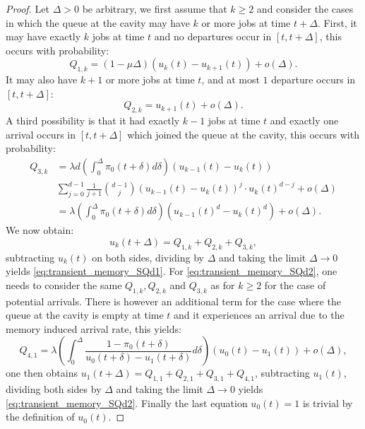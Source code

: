 \documentclass[12pt]{report}
\begin{document}
\begin{proof}
Let $\Delta > 0$ be arbitrary, we first assume that $k\geq 2$ and consider the cases in which the queue at the cavity may have $k$ or more jobs at time $t+\Delta$. First, it may have exactly $k$ jobs at time $t$ and no departures occur in $[t,t+\Delta]$, this occurs with probability:
\begin{equation}
Q_{1,k}=(1-\mu \Delta) (u_k(t)-u_{k+1}(t)) + o(\Delta). \label{eq:transient_uk_proof_1.1}
\end{equation}
It may also have $k+1$ or more jobs at time $t$, and at most $1$ departure occurs in $[t,t+\Delta]$:
\begin{equation}
Q_{2,k}=u_{k+1}(t) + o(\Delta). \label{eq:transient_uk_proof_1.2}
\end{equation}
A third possibility is that it had exactly $k-1$ jobs at time $t$ and exactly one arrival occurs in $[t,t+\Delta]$ which joined the queue at the cavity, this occurs with probability:
\begin{align}
Q_{3,k}&=\lambda d  \left(\int_0^\Delta \pi_0(t+\delta) d\delta \right)  (u_{k-1}(t)-u_k(t)) \\
&\sum_{j=0}^{d-1} \frac{1}{j+1	} \binom{d-1}{j} (u_{k-1}(t)-u_k(t))^j \cdot u_k(t)^{d-j} +o(\Delta)\nonumber\\
&= \lambda \left(\int_0^\Delta \pi_0(t+\delta) d\delta \right)  (u_{k-1}(t)^d - u_k(t)^d)+o(\Delta).
\label{eq:transient_uk_proof_2}
\end{align}
We now obtain:
$$
u_{k}(t+\Delta)= Q_{1,k}+Q_{2,k}+Q_{3,k},
$$
subtracting $u_k(t)$ on both sides, dividing by $\Delta$ and taking the limit $\Delta \rightarrow 0$ yields \eqref{eq:transient_memory_SQd1}. For \eqref{eq:transient_memory_SQd2}, one needs to consider the same $Q_{1,k},Q_{2,k}$ and $Q_{3,k}$ as for $k\geq 2$ for the case of potential arrivals. There is however an additional term for the case where the queue at the cavity is empty at time $t$ and it experiences an arrival due to the memory induced arrival rate, this yields:
$$
Q_{4,1}
=
\lambda \left( \int_0^\Delta \frac{1-\pi_0(t+\delta)}{u_0(t+\delta)-u_1(t+\delta)} d\delta \right) (u_{0}(t)-u_1(t)) + o(\Delta),
$$
one then obtains $u_1(t+\Delta)=Q_{1,1}+Q_{2,1}+Q_{3,1}+Q_{4,1}$, subtracting $u_1(t)$, dividing both sides by $\Delta$ and taking the limit $\Delta \rightarrow 0$ yields \eqref{eq:transient_memory_SQd2}. Finally the last equation $u_0(t)=1$ is trivial by the definition of $u_0(t)$.
\end{proof}
\end{document}
